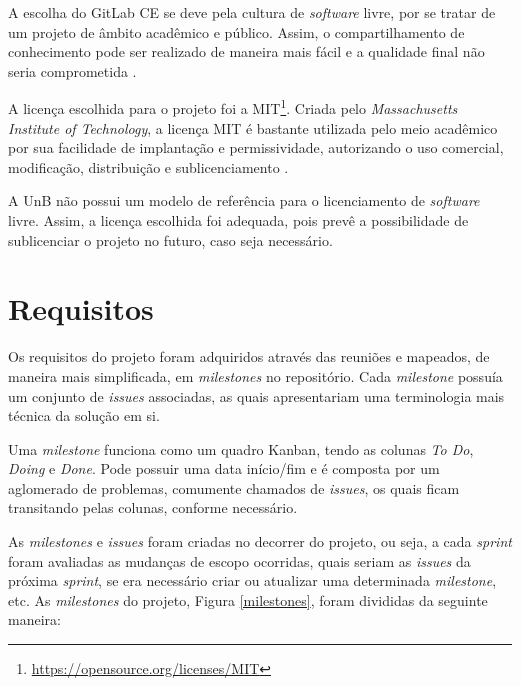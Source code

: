 A escolha do GitLab CE se deve pela cultura de \textit{software} livre, por se tratar de um projeto de âmbito acadêmico e público. Assim, o compartilhamento de conhecimento pode ser realizado de maneira mais fácil e a qualidade final não seria comprometida \cite{raymond1999}.

A licença escolhida para o projeto foi a MIT\footnote{\url{https://opensource.org/licenses/MIT}}. Criada pelo \textit{Massachusetts Institute of Technology}, a licença MIT é bastante utilizada pelo meio acadêmico por sua facilidade de implantação e permissividade, autorizando o uso comercial, modificação, distribuição e sublicenciamento \cite{mit_license}.

A UnB não possui um modelo de referência para o licenciamento de \textit{software} livre. Assim, a licença escolhida foi adequada, pois prevê a possibilidade de sublicenciar o projeto no futuro, caso seja necessário.

\section{Requisitos}
Os requisitos do projeto foram adquiridos através das reuniões e mapeados, de maneira mais simplificada, em \textit{milestones} \cite{gitlab} no repositório. Cada \textit{milestone} possuía um conjunto de \textit{issues} associadas, as quais apresentariam uma terminologia mais técnica da solução em si.

Uma \textit{milestone} funciona como um quadro Kanban, tendo as colunas \textit{To Do}, \textit{Doing} e \textit{Done}. Pode possuir uma data início/fim e é composta por um aglomerado de problemas, comumente chamados de \textit{issues}, os quais ficam transitando pelas colunas, conforme necessário.

As \textit{milestones} e \textit{issues} foram criadas no decorrer do projeto, ou seja, a cada \textit{sprint} foram avaliadas as mudanças de escopo ocorridas, quais seriam as \textit{issues} da próxima \textit{sprint}, se era necessário criar ou atualizar uma determinada \textit{milestone}, etc. As \textit{milestones} do projeto, Figura \ref{milestones}, foram divididas da seguinte maneira:

